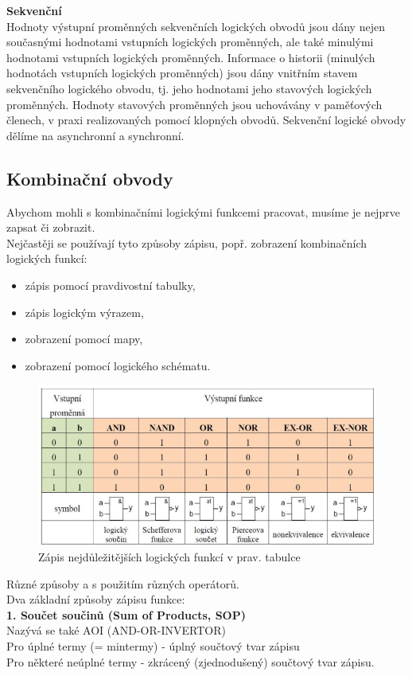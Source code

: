 \textbf{Sekvenční}\\
Hodnoty výstupní proměnných sekvenčních logických obvodů jsou dány nejen
současnými hodnotami vstupních logických proměnných, ale také minulými hodnotami
vstupních logických proměnných. Informace o historii (minulých hodnotách vstupních
logických proměnných) jsou dány vnitřním stavem sekvenčního logického obvodu, tj. jeho
hodnotami jeho stavových logických proměnných. Hodnoty stavových proměnných jsou
uchovávány v paměťových členech, v praxi realizovaných pomocí klopných obvodů.
Sekvenční logické obvody dělíme na asynchronní a synchronní.


\subsection{Kombinační obvody}
Abychom mohli s kombinačními logickými funkcemi
pracovat, musíme je nejprve zapsat či zobrazit.\\
Nejčastěji se používají tyto způsoby zápisu, popř.
zobrazení kombinačních logických funkcí:
\begin{itemize}
\item zápis pomocí pravdivostní tabulky,
\item zápis logickým výrazem,
\item zobrazení pomocí mapy,
\item zobrazení pomocí logického schématu.
\end{itemize}

   \begin{figure}[h]
   \begin{center}
     \includegraphics[scale=0.6]{images/Tab.png}
   \end{center}
   \caption{Zápis nejdůležitějších logických funkcí v prav. tabulce}
  \end{figure}

Různé způsoby a s použitím různých operátorů.\\
Dva základní způsoby zápisu funkce:\\
\textbf{1. Součet součinů (Sum of Products, SOP)}\\
Nazývá se také AOI (AND-OR-INVERTOR)\\
Pro úplné termy (= mintermy) - úplný součtový tvar zápisu\\
Pro některé neúplné termy - zkrácený (zjednodušený) součtový tvar zápisu.\\

